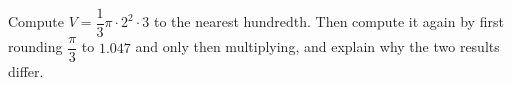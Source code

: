 Compute $V=\dfrac{1}{3}\pi\cdot2^2\cdot3$ to the nearest hundredth. Then compute it again by first rounding $\dfrac{\pi}{3}$ to $1.047$ and only then multiplying, and explain why the two results differ.
